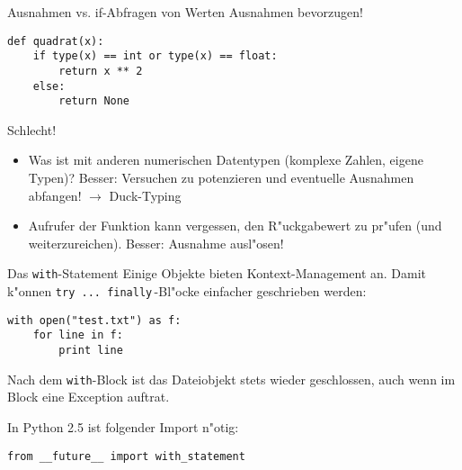 \begin{frame}[fragile]{Ausnahmen vs. if-Abfragen von Werten}
Ausnahmen bevorzugen!

\begin{lstlisting}
def quadrat(x):
    if type(x) == int or type(x) == float:
        return x ** 2
    else:
        return None
\end{lstlisting}
Schlecht!

\begin{itemize}
  \item Was ist mit anderen numerischen Datentypen (komplexe Zahlen, eigene Typen)? Besser: Versuchen zu potenzieren und eventuelle Ausnahmen abfangen! $\rightarrow$ \alert{Duck-Typing}

  \item Aufrufer der Funktion kann vergessen, den R"uckgabewert zu pr"ufen (und weiterzureichen). Besser: Ausnahme ausl"osen!
\end{itemize}
\end{frame}


\begin{frame}[fragile]{Das \texttt{with}-Statement}
Einige Objekte bieten Kontext-Management an. Damit k"onnen \lstinline{try ... finally}\,-Bl"ocke einfacher geschrieben werden:
\begin{lstlisting}
with open("test.txt") as f:
    for line in f:
        print line
\end{lstlisting}
Nach dem \lstinline{with}-Block ist das Dateiobjekt stets wieder geschlossen, auch wenn im Block eine Exception auftrat.\vspace{5mm}

In Python 2.5 ist folgender Import n"otig:
\begin{lstlisting}
from __future__ import with_statement
\end{lstlisting}
\end{frame}
